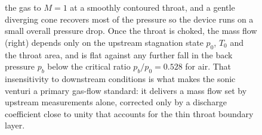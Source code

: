 \begin{figure}[htbp]
{the gas to $M=1$ at a smoothly contoured throat, and a gentle diverging
cone recovers most of the pressure so the device runs on a small
overall pressure drop. Once the throat is choked, the mass flow (right)
depends only on the upstream stagnation state $p_0$, $T_0$ and the
throat area, and is flat against any further fall in the back pressure
$p_b$ below the critical ratio $p_b/p_0 = 0.528$ for air. That
insensitivity to downstream conditions is what makes the sonic venturi
a primary gas-flow standard: it delivers a mass flow set by upstream
measurements alone, corrected only by a discharge coefficient close to
unity that accounts for the thin throat boundary layer.}
\label{fig:vol03ch13:critical-venturi}
\end{figure}
